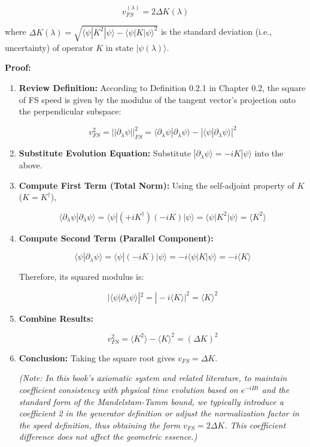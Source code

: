 $$v_{FS}^{(\lambda)} = 2\Delta K(\lambda)$$

where \textbf{$\Delta K(\lambda) = \sqrt{\langle \psi | K^2 | \psi \rangle - \langle \psi | K | \psi \rangle^2}$} is the standard deviation (i.e., uncertainty) of operator \textbf{$K$} in state \textbf{$|\psi(\lambda)\rangle$}.

\textbf{Proof:}

\begin{enumerate}
\item \textbf{Review Definition:} According to Definition 0.2.1 in Chapter 0.2, the square of FS speed is given by the modulus of the tangent vector's projection onto the perpendicular subspace:

   $$v_{FS}^2 = ||\partial_{\lambda}\psi||_{FS}^2 = \langle \partial_{\lambda}\psi | \partial_{\lambda}\psi \rangle - |\langle \psi | \partial_{\lambda}\psi \rangle|^2$$

\item \textbf{Substitute Evolution Equation:} Substitute \textbf{$|\partial_{\lambda}\psi\rangle = -i K |\psi\rangle$} into the above.

\item \textbf{Compute First Term (Total Norm):} Using the self-adjoint property of \textbf{$K$} (\textbf{$K=K^{\dagger}$}),

   $$\langle \partial_{\lambda}\psi | \partial_{\lambda}\psi \rangle = \langle \psi | (+i K^{\dagger}) (-i K) | \psi \rangle = \langle \psi | K^2 | \psi \rangle = \langle K^2 \rangle$$

\item \textbf{Compute Second Term (Parallel Component):}

   $$\langle \psi | \partial_{\lambda}\psi \rangle = \langle \psi | (-i K) | \psi \rangle = -i \langle \psi | K | \psi \rangle = -i \langle K \rangle$$

   Therefore, its squared modulus is:

   $$|\langle \psi | \partial_{\lambda}\psi \rangle|^2 = |-i \langle K \rangle|^2 = \langle K \rangle^2$$

\item \textbf{Combine Results:}

   $$v_{FS}^2 = \langle K^2 \rangle - \langle K \rangle^2 = (\Delta K)^2$$

\item \textbf{Conclusion:} Taking the square root gives \textbf{$v_{FS} = \Delta K$}.

   \textit{(Note: In this book's axiomatic system and related literature, to maintain coefficient consistency with physical time evolution based on $e^{-iHt}$ and the standard form of the Mandelstam-Tamm bound, we typically introduce a coefficient 2 in the generator definition or adjust the normalization factor in the speed definition, thus obtaining the form \textbf{$v_{FS} = 2\Delta K$}. This coefficient difference does not affect the geometric essence.)}
\end{enumerate}

